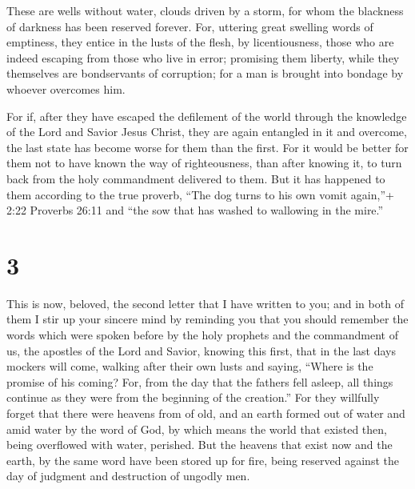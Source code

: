  These are wells without water, clouds driven by a storm,
for whom the blackness of darkness has been reserved forever.
 For, uttering great swelling words of emptiness, they
entice in the lusts of the flesh, by licentiousness, those who are
indeed escaping from those who live in error;  promising
them liberty, while they themselves are bondservants of corruption; for
a man is brought into bondage by whoever overcomes him.

 For if, after they have escaped the defilement of the
world through the knowledge of the Lord and Savior Jesus Christ, they
are again entangled in it and overcome, the last state has become worse
for them than the first.  For it would be better for them
not to have known the way of righteousness, than after knowing it, to
turn back from the holy commandment delivered to them.  But
it has happened to them according to the true proverb, ``The dog turns
to his own vomit again,''+ 2:22 Proverbs 26:11 and ``the sow that has
washed to wallowing in the mire.''

\hypertarget{section-2}{%
\section{3}\label{section-2}}

 This is now, beloved, the second letter that I have written
to you; and in both of them I stir up your sincere mind by reminding you
 that you should remember the words which were spoken before
by the holy prophets and the commandment of us, the apostles of the Lord
and Savior,  knowing this first, that in the last days
mockers will come, walking after their own lusts  and
saying, ``Where is the promise of his coming? For, from the day that the
fathers fell asleep, all things continue as they were from the beginning
of the creation.''  For they willfully forget that there
were heavens from of old, and an earth formed out of water and amid
water by the word of God,  by which means the world that
existed then, being overflowed with water, perished.  But
the heavens that exist now and the earth, by the same word have been
stored up for fire, being reserved against the day of judgment and
destruction of ungodly men.

